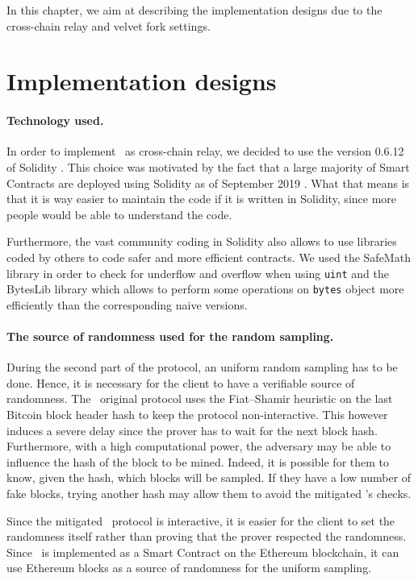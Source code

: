In this chapter, we aim at describing the implementation designs due to the cross-chain relay and velvet fork settings.

\section{Implementation designs}
\paragraph{Technology used.} In order to implement \FC\ as cross-chain relay, we decided to use the version 0.6.12 of Solidity \cite{Solidity}. This choice was motivated by the fact that a large majority of Smart Contracts are deployed using Solidity as of September 2019 \cite{VyperSolidity}. What that means is that it is way easier to maintain the code if it is written in Solidity, since more people would be able to understand the code.

Furthermore, the vast community coding in Solidity also allows to use libraries coded by others to code safer and more efficient contracts. We used the SafeMath library \cite{SafeMath} in order to check for underflow and overflow when using \texttt{uint} and the BytesLib library \cite{BytesLib} which allows to perform some operations on \texttt{bytes} object more efficiently than the corresponding naive versions.

\paragraph{The source of randomness used for the random sampling.} During the second part of the protocol, an uniform random sampling has to be done. Hence, it is necessary for the client to have a verifiable source of randomness. The \FC\ original protocol uses the Fiat--Shamir heuristic on the last Bitcoin block header hash to keep the protocol non-interactive. This however induces a severe delay since the prover has to wait for the next block hash. Furthermore, with a high computational power, the adversary may be able to influence the hash of the block to be mined. Indeed, it is possible for them to know, given the hash, which blocks will be sampled. If they have a low number of fake blocks, trying another hash may allow them to avoid the mitigated \FC's checks.

Since the mitigated \FC\ protocol is interactive, it is easier for the client to set the randomness itself rather than proving that the prover respected the randomness. Since \FC\ is implemented as a Smart Contract on the Ethereum blockchain, it can use Ethereum blocks as a source of randomness for the uniform sampling.

